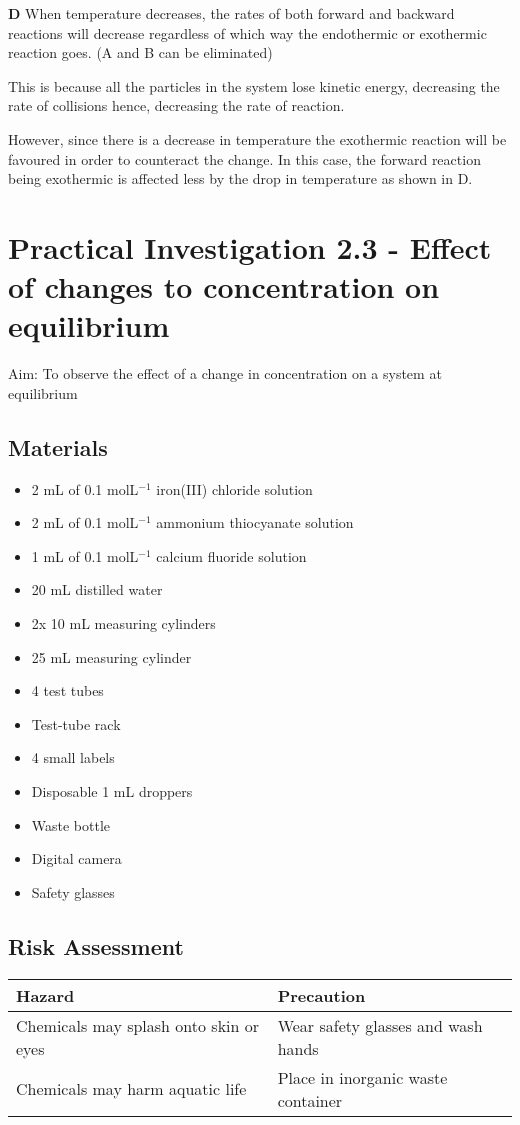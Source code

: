 	\textbf{D} When temperature decreases, the rates of both forward and backward reactions will decrease regardless of which way the endothermic or exothermic reaction goes. (A and B can be eliminated)

	This is because all the particles in the system lose kinetic energy, decreasing the rate of collisions hence, decreasing the rate of reaction.
	
	However, since there is a decrease in temperature the exothermic reaction will be favoured in order to counteract the change. In this case, the forward reaction being exothermic is affected less by the drop in temperature as shown in D.

\pagebreak
\section{Practical Investigation 2.3 - Effect of changes to concentration on equilibrium} \label{31/10/2024}

	Aim: To observe the effect of a change in concentration on a system at equilibrium

	\subsection{Materials}
		\begin{itemize}
			\item 2 mL of 0.1 molL$^{-1}$ iron(III) chloride solution
			\item 2 mL of 0.1 molL$^{-1}$ ammonium thiocyanate solution
			\item 1 mL of 0.1 molL$^{-1}$ calcium fluoride solution
			\item 20 mL distilled water
			\item 2x 10 mL measuring cylinders
			\item 25 mL measuring cylinder
			\item 4 test tubes
			\item Test-tube rack
			\item 4 small labels
			\item Disposable 1 mL droppers
			\item Waste bottle
			\item Digital camera
			\item Safety glasses
		\end{itemize}

	\subsection{Risk Assessment}
		\begin{table}[htbp]
			\centering
			\begin{tabular}{l|l}
				\hline
				Hazard & Precaution \\ \hline
				Chemicals may splash onto skin or eyes & Wear safety glasses and wash hands  \\
				Chemicals may harm aquatic life & Place in inorganic waste container \\
			\end{tabular}
		\end{table}

